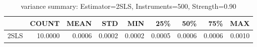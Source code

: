 \begin{table}[ht]
\centering
\caption{variance summary: Estimator=2SLS, Instruments=500, Strength=0.90}
\begin{tabular}{lrrrrrrrr}
\toprule
 & COUNT & MEAN & STD & MIN & 25\% & 50\% & 75\% & MAX \\
\midrule
2SLS & 10.0000 & 0.0006 & 0.0002 & 0.0002 & 0.0005 & 0.0006 & 0.0006 & 0.0010 \\
\bottomrule
\end{tabular}
\end{table}

